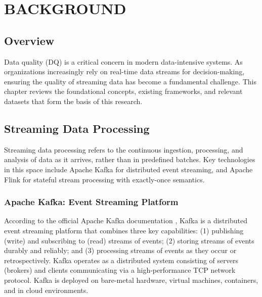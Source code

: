 \chapter{BACKGROUND}

\section{Overview}

Data quality (DQ) is a critical concern in modern data-intensive systems. As organizations increasingly rely on real-time data streams for decision-making, ensuring the quality of streaming data has become a fundamental challenge. This chapter reviews the foundational concepts, existing frameworks, and relevant datasets that form the basis of this research.

\section{Streaming Data Processing}

Streaming data processing refers to the continuous ingestion, processing, and analysis of data as it arrives, rather than in predefined batches. Key technologies in this space include Apache Kafka \citep{kafkaintro2024} for distributed event streaming, and Apache Flink \citep{flinkdocs2024} for stateful stream processing with exactly-once semantics.

\subsection{Apache Kafka: Event Streaming Platform}

According to the official Apache Kafka documentation \citep{kafkaintro2024}, Kafka is a distributed event streaming platform that combines three key capabilities: (1) publishing (write) and subscribing to (read) streams of events; (2) storing streams of events durably and reliably; and (3) processing streams of events as they occur or retrospectively. Kafka operates as a distributed system consisting of servers (brokers) and clients communicating via a high-performance TCP network protocol. Kafka is deployed on bare-metal hardware, virtual machines, containers, and in cloud environments.

